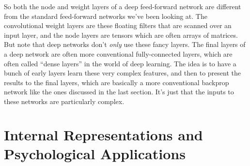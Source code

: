 So both the node and weight layers of a deep feed-forward network are different from the standard feed-forward networks we've been looking at. The convolutional weight layers are these floating filters that are scanned over an input layer, and the node layers are tensors which are often  arrays of matrices. But note that deep networks don't \emph{only} use these fancy layers. The final layers of a deep network are often more conventional fully-connected layers, which are often called ``dense layers'' in the world of deep learning. The idea is to have a bunch of early layers learn these very complex features, and then to present the results to the final layers, which are basically a more conventional backprop network like the ones discussed in the last section. It's just that the inputs to these networks are particularly complex.



\section{Internal Representations and Psychological Applications}


